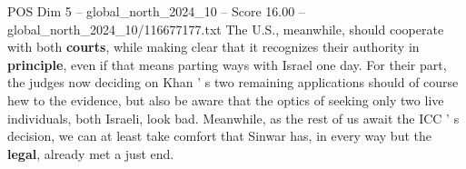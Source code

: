 \begin{textsample}{POS Dim 5 – global\_north\_2024\_10 – Score 16.00 – global\_north\_2024\_10/116677177.txt}
The U.S., meanwhile, should cooperate with both \textbf{courts}, while making clear that it recognizes their authority in \textbf{principle}, even if that means parting ways with Israel one day.
For their part, the judges now deciding on Khan ' s two remaining applications should of course hew to the evidence, but also be aware that the optics of seeking only two live individuals, both Israeli, look bad.
Meanwhile, as the rest of us await the ICC ' s decision, we can at least take comfort that Sinwar has, in every way but the \textbf{legal}, already met a just end.

\end{textsample}
